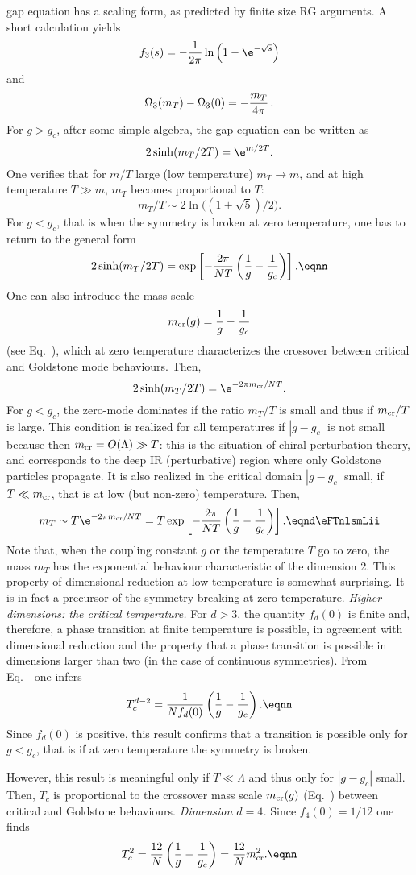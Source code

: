 gap equation has a scaling form, as predicted by finite size RG arguments. A short calculation yields
$$f_3(s)=-{1\over
2\pi}\ln\left(1-\e^{-\sqrt{s}}\right) $$
and
$$\Omega_3(m_T)-\Omega_3(0)=-{m_T\over 4\pi}\,.$$
For $g>g_c$, after some simple algebra, the gap equation can be written as
$$2\sinh(m_T/2T)=\e^{m/2T} .$$
One verifies that for $m/T$ large (low temperature) $m_T\to m$, and at high
temperature $T\gg m$, $m_T$ becomes proportional to $T$:
$$m_T /T\sim 2\ln\bigl((1+\sqrt{5})/2\bigr).$$
For $g<g_c$,  that is when the symmetry is broken at zero temperature, one has to return to the general form
$$2\sinh(m_T/2T)=\exp\left[-{2\pi  \over
NT}\left({1\over g}-{1\over g_c}\right) \right]. \eqnn $$
One can also introduce the mass scale %
$$m_{\rm cr}(g)=  {1\over g}-{1\over g_c}  $$
(see Eq.~\eqns{\eNmcrossa}), which at zero temperature characterizes the crossover between
critical and Goldstone mode behaviours. Then,
 $$2\sinh(m_T/2T)=\e^{-2 \pi m_{\rm cr}/NT} .$$
For $g<g_c$, the zero-mode dominates if  the ratio  $m_T/T $  is small and thus if $ m_{\rm cr}/ T $ is large. This condition is  realized  for all temperatures  if $|g-g_c|$ is not small because then $m_{\rm cr}=O(\Lambda )\gg T$:
this is the situation of chiral perturbation theory, and corresponds to the deep  IR (perturbative) region where only Goldstone particles propagate.
It is also realized  in the critical domain $|g-g_c|$
small, if $T\ll m_{\rm cr}$, that is at low (but non-zero) temperature. Then,
$$ m_T \sim T \e^{-2 \pi m_{\rm cr}/NT} =T  \exp\left[-{2\pi  \over
NT}\left({1\over g}-{1\over g_c}\right) \right]. \eqnd\eFTnlsmLii$$
Note that, when the coupling constant $g$  or
the temperature $T$ go to zero, the mass $m_T$ has the exponential behaviour characteristic of the dimension 2.
This property  of dimensional reduction at low temperature
is somewhat surprising. It is in fact a precursor of the symmetry breaking at zero temperature.
\medskip
{\it Higher dimensions: the critical temperature.} For $d>3$, the quantity $f_d(0)$ is finite
and, therefore, a phase transition at finite temperature is possible, in agreement
with dimensional reduction and the property that a phase transition
is possible in dimensions larger than two (in the case of continuous symmetries). From Eq.~\eFTnlsgap\ one infers
$$T_c^{d-2}={1\over Nf_d(0)}  \left({1\over g}-{1\over g_c}\right).\eqnn $$
Since $f_d(0)$ is positive, this result confirms that a transition is possible only for $g<g_c$,  that is if at zero temperature the symmetry is broken. \par
However, this result is meaningful only if $T\ll \Lambda $ and thus only  for $|g-g_c|$ small.  Then, $T_c$ is proportional to the crossover mass scale $m_{\rm cr}(g)$ (Eq.~\eqns{\eNmcrossa}) between critical and Goldstone behaviours.
\smallskip
{\it Dimension $d=4$.}   Since $f_4(0)=1/12$  one finds
$$T_c^2={12\over N}\left({1\over g}-{1\over g_c}\right)={12 \over N} m_{\rm cr}^2.\eqnn $$

